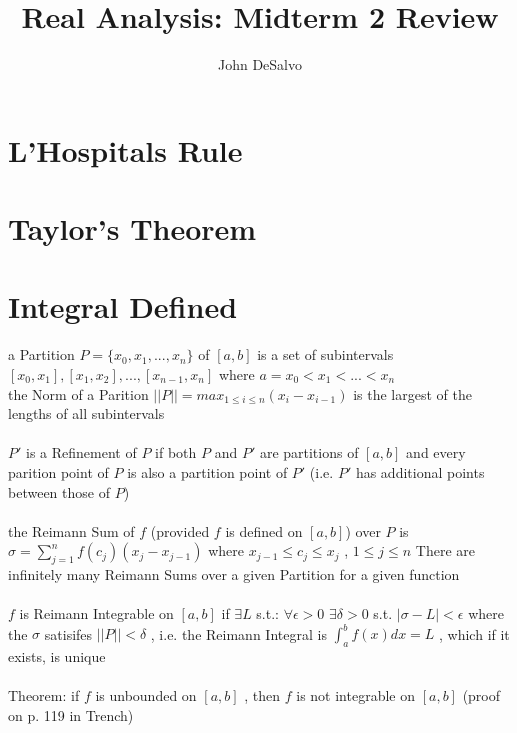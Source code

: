 \documentclass[12pt]{article}
\begin{document}
\pagestyle{plain}

\title{Real Analysis: Midterm 2 Review}
\author{John DeSalvo}
\maketitle

\tableofcontents

\section{L'Hospitals Rule}


\section{Taylor's Theorem}


\section{Integral Defined}
a Partition $P = \{x_{0}, x_{1}, ..., x_{n}\}$ of $[a,b]$ is a set of subintervals $[x_{0}, x_{1}], [x_{1}, x_{2}], ..., [x_{n-1}, x_{n}]$ where $a = x_{0} < x_{1} < ... <x_{n}$ \\
the Norm of a Parition $||P|| = max_{1 \le i \le n}(x_{i} - x_{i-1})$ is the largest of the lengths of all subintervals \\
\\
$P'$ is a Refinement of $P$ if both $P$ and $P'$ are partitions of $[a,b]$ and every parition point of $P$ is also a partition point of $P'$ (i.e. $P'$ has additional points between those of $P$) \\
\\
the Reimann Sum of $f$ (provided $f$ is defined on $[a,b]$) over $P$ is $\sigma = \sum_{j=1}^{n}f(c_{j})(x_{j} - x_{j-1})$ where $x_{j-1} \le c_{j} \le x_{j}$ , $1 \le j \le n$   There are infinitely many Reimann Sums over a given Partition for a given function \\
\\
$f$ is Reimann Integrable on $[a,b]$ if $\exists L$ s.t.:  $\forall \epsilon > 0$ $\exists \delta > 0$ s.t. $|\sigma - L| < \epsilon$ where the $\sigma$ satisifes $||P|| < \delta$ , i.e. the Reimann Integral is $\int_{a}^{b}f(x)dx = L$ , which if it exists, is unique \\
\\
Theorem: if $f$ is unbounded on $[a,b]$ , then $f$ is not integrable on $[a,b]$ (proof on p. 119 in Trench)\\
\\
\end{document}

